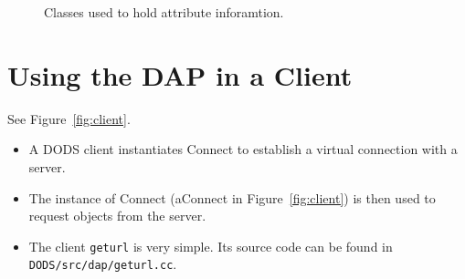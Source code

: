 \documentclass{article}
\newcommand{\dap}{\rm {\small DAP}\raise.5ex\hbox{\footnotesize ++}\xspace}
\begin{document}
\begin{figure}[h]
\begin{center}
\caption{Classes used to hold attribute inforamtion.}
\label{fig:attributes}
\end{center}
\end{figure}

\begin{sidewaysfigure}[h]
\begin{center}
\caption{Using an interface to combine information from the DAS and DDS
  objects.} 
\label{fig:interface}
\end{center}
\end{sidewaysfigure}

\section{Using the DAP in a Client}
\label{sec:client}

See Figure~\ref{fig:client}.

\begin{itemize}
\item A DODS client instantiates Connect to establish a virtual connection
  with a server.
  
\item The instance of Connect (aConnect in Figure~\ref{fig:client}) is then
  used to request objects from the server.
  
\item The client \texttt{geturl} is very simple. Its source code can be found
  in \texttt{DODS/\-src/\-dap/\-geturl.cc}.
\end{itemize}

\begin{sidewaysfigure}[h]
\begin{center}
\caption{Using the \dap class library to build a DODS client.}
\label{fig:client}
\end{center}
\end{sidewaysfigure}



%
%
%

\end{document}
